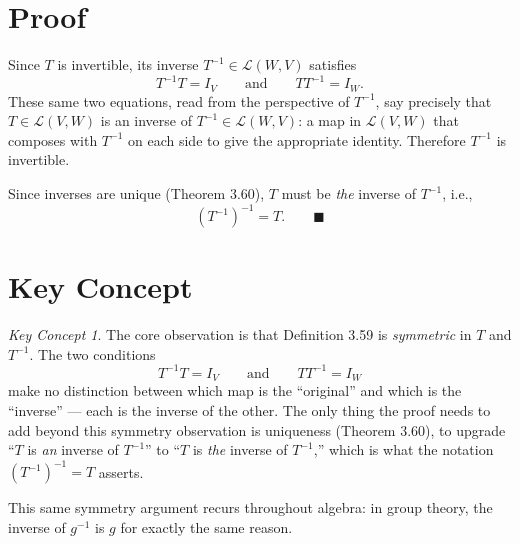 \documentclass[12pt]{article}
\theoremstyle{remark}
\newtheorem*{note}{Key Concept}
\newcommand{\Lc}{\mathcal{L}}
\begin{document}
\section*{Proof}
 
Since $T$ is invertible, its inverse $T^{-1} \in \Lc(W, V)$ satisfies
\[
    T^{-1}T = I_V \qquad \text{and} \qquad TT^{-1} = I_W.
\]
These same two equations, read from the perspective of $T^{-1}$, say precisely
that $T \in \Lc(V, W)$ is an inverse of $T^{-1} \in \Lc(W, V)$: a map in
$\Lc(V, W)$ that composes with $T^{-1}$ on each side to give the appropriate
identity. Therefore $T^{-1}$ is invertible.
 
Since inverses are unique (Theorem 3.60), $T$ must be \emph{the} inverse of
$T^{-1}$, i.e.,
\[
    \left(T^{-1}\right)^{-1} = T. \qquad \blacksquare
\]
 
\section*{Key Concept}
 
\begin{note}
The core observation is that Definition 3.59 is \emph{symmetric} in $T$ and
$T^{-1}$. The two conditions
\[
    T^{-1}T = I_V \qquad \text{and} \qquad TT^{-1} = I_W
\]
make no distinction between which map is the ``original'' and which is the
``inverse'' --- each is the inverse of the other. The only thing the proof needs
to add beyond this symmetry observation is uniqueness (Theorem 3.60), to
upgrade ``$T$ is \emph{an} inverse of $T^{-1}$'' to ``$T$ is \emph{the}
inverse of $T^{-1}$,'' which is what the notation $(T^{-1})^{-1} = T$ asserts.
 
This same symmetry argument recurs throughout algebra: in group theory, the
inverse of $g^{-1}$ is $g$ for exactly the same reason.
\end{note}
 
\end{document}
